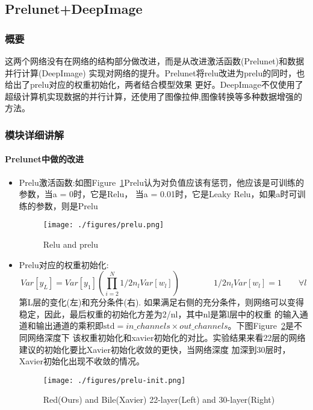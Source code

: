 \documentclass{article}
\newcommand{\tao}[1]{\todo[color=red!20,size=\footnotesize]{T: #1}{}}
\begin{document}
\begin{CJK}{UTF8}{gbsn}
\subsection{Prelunet+DeepImage}
\subsubsection{概要}
这两个网络没有在网络的结构部分做改进，而是从改进激活函数(Prelunet)和数据并行计算(DeepImage)
实现对网络的提升。Prelunet将relu改进为prelu的同时，也给出了prelu对应的权重初始化，两者结合模型效果
更好。DeepImage不仅使用了超级计算机实现数据的并行计算，还使用了图像拉伸,图像转换等多种数据增强的
方法。

\subsubsection{模块详细讲解}
\paragraph{Prelunet中做的改进}
\begin{itemize}
    \item Prelu激活函数:如图Figure~\ref{fig:prelu}Prelu认为对负值应该有惩罚，他应该是可训练的参数，当a = 0时，它是Relu，
    当a = 0.01时，它是Leaky Relu，如果a时可训练的参数，则是Prelu
    \begin{figure}[!h]
        \centering
        \texttt{[image: ./figures/prelu.png]}
        \caption{Relu and prelu}
        \label{fig:prelu}
    \end{figure}
    \item Prelu对应的权重初始化:
    \begin{equation}
        Var[y_L] = Var[y_1](\prod_{i=2}^N 1/2n_lVar[w_l]) \qquad \qquad  1/2n_lVar[w_l] = 1 \qquad \forall l
    \end{equation}
    第L层的变化(左)和充分条件(右).
    如果满足右侧的充分条件，则网络可以变得稳定，因此，最后权重的初始化方差为2/nl，其中nl是第l层中的权重
    的输入通道和输出通道的乘积即$\text{std}=in\_channels \times out\_channels$。下图Figure~\ref{fig:preluinit}是不同网络深度下
    该权重初始化和xavier初始化的对比。实验结果来看22层的网络建议的初始化要比Xavier初始化收敛的更快，当网络深度
    加深到30层时，Xavier初始化出现不收敛的情况。
    \begin{figure}[!h]
        \centering
        \texttt{[image: ./figures/prelu-init.png]}
        \caption{Red(Ours) and Bile(Xavier) 22-layer(Left) and 30-layer(Right)}
        \label{fig:preluinit}
    \end{figure}
    

\end{itemize}
\end{CJK}
\end{document}
